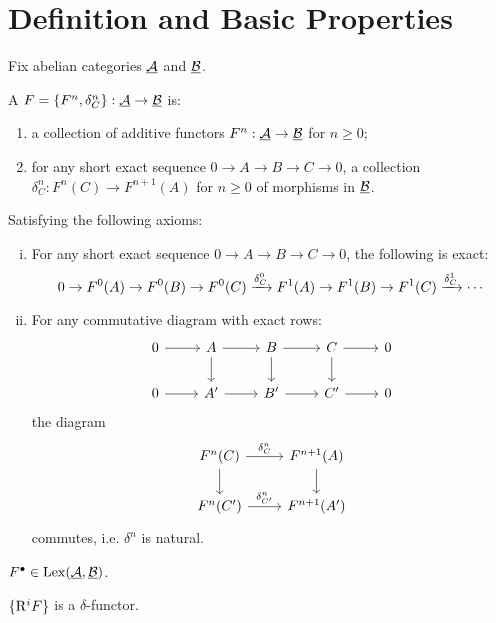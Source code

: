 \section{Definition and Basic Properties}

Fix abelian categories \( \underline{\mathcal A} \) and \( \underline{\mathcal B} \).

\begin{definition*}
	A  \( F = \{F^n, \delta_{C}^n\}: \underline{\mathcal A} \to \underline{\mathcal B} \) is:
	\begin{enumerate}
		\item a collection of additive functors \( F^n: \underline{\mathcal A} \to \underline{\mathcal B} \) for \( n \ge 0 \);
		\item for any short exact sequence \( 0 \to A \to B \to C \to 0 \), a collection \( \delta_C^n: F^n(C) \to F^{n+1}(A) \) for \( n \ge 0 \) of morphisms in \( \underline{\mathcal B} \).
	\end{enumerate}
	Satisfying the following axioms:
	\begin{enumerate}[(i)]
		\item For any short exact sequence \( 0 \to A \to B \to C \to 0 \), the following is exact:
			\[
				0 \to F^0(A) \to F^0(B) \to F^0(C) \xrightarrow{\delta_C^0} F^1(A) \to F^1(B) \to F^1(C) \xrightarrow{\delta_C^1} \dotsm
			\]
		\item For any commutative diagram with exact rows:
			\[
				\begin{tikzcd}
					0 \arrow[r] & A \arrow[r] \arrow[d] & B \arrow[r] \arrow[d] & C \arrow[r] \arrow[d] & 0 \\
					0 \arrow[r] & A' \arrow[r] & B' \arrow[r] & C' \arrow[r] & 0
				\end{tikzcd}
			\]
			the diagram
			\[
				\begin{tikzcd}
					F^n(C) \arrow[r,"\delta_C^n"] \arrow[d] & F^{n+1}(A) \arrow[d] \\
					F^n(C') \arrow[r,"\delta_{C'}^n"] & F^{n+1}(A')
				\end{tikzcd}
			\]
			commutes, i.e. \( \delta^n \) is natural.
	\end{enumerate}
\end{definition*}

\begin{remark*}
	\( F^\bullet \in \operatorname{Lex}(\underline{\mathcal A}, \underline{\mathcal B}) \).
\end{remark*}

\begin{example*}
	\( \{\mathrm R^iF\} \) is a \( \delta \)-functor.
\end{example*}

